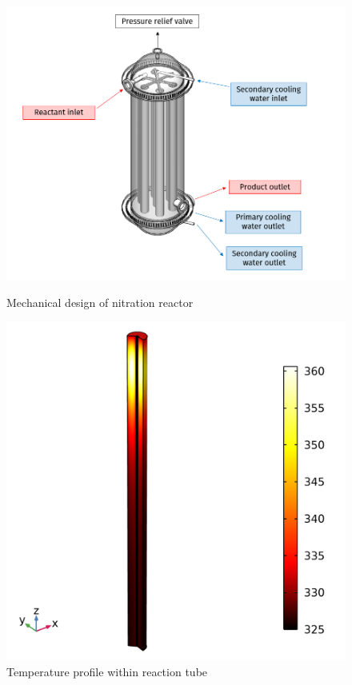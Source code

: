 \begin{figure}[h]
    \centering
    \begin{minipage}[t]{0.53\linewidth}
        \includegraphics[width=\linewidth]{figures/FYD executive sum.PNG}
        \caption{Mechanical design of nitration reactor}
        \label{fig:executivesummaryreactor}
    \end{minipage}\hfill
    \begin{minipage}[t]{0.45\linewidth}
        \includegraphics[width=\linewidth]{chapters/2-reaction/figures/temperature-surface.png}
        \caption{Temperature profile within reaction tube}
        \label{fig:reactor-comsol}
    \end{minipage}
\end{figure}

